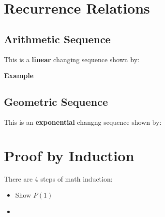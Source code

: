 \documentclass[11pt]{article}
\begin{document}
\section{Recurrence Relations}
\label{sec-2}

\subsection{Arithmetic Sequence}
\label{sec-2-1}

This is a \textbf{linear} changing sequence shown by:

\textbf{Example}


\subsection{Geometric Sequence}
\label{sec-2-2}

This is an \textbf{exponential} changng sequence shown by:


\section{Proof by Induction}
\label{sec-3}

There are 4 steps of math induction:

\begin{itemize}
\item Show $P(1)$
\item 
\end{itemize}
\end{document}
